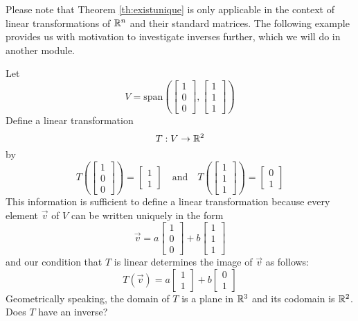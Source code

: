 \documentclass{ximera}
\begin{document}


Please note that Theorem \ref{th:existunique} is only applicable in the context of linear transformations of $\mathbb{R}^n$ and their standard matrices.  The following example provides us with motivation to investigate inverses further, which we will do in another module.

\begin{initprob}\label{init:subtosub}
Let $$V=\text{span}\left(\begin{bmatrix}1\\0\\0\end{bmatrix}, \begin{bmatrix}1\\1\\1\end{bmatrix}\right)$$
Define a linear transformation $$T:V\rightarrow \mathbb{R}^2$$
by $$T\left(\begin{bmatrix}1\\0\\0\end{bmatrix}\right)=\begin{bmatrix}1\\1\end{bmatrix}\quad \text{and} \quad T\left(\begin{bmatrix}1\\1\\1\end{bmatrix}\right)=\begin{bmatrix}0\\1\end{bmatrix}$$
This information is sufficient to define a linear transformation because every element $\vec{v}$ of $V$ can be written uniquely in the form $$\vec{v}=a\begin{bmatrix}1\\0\\0\end{bmatrix}+b\begin{bmatrix}1\\1\\1\end{bmatrix}$$  
and our condition that $T$ is linear determines the image of $\vec{v}$ as follows: $$T(\vec{v})=a\begin{bmatrix}1\\1\end{bmatrix}+b\begin{bmatrix}0\\1\end{bmatrix}$$
Geometrically speaking, the domain of $T$ is a plane in $\mathbb{R}^3$ and its codomain is $\mathbb{R}^2$.  Does $T$ have an inverse?  


\end{initprob}
\end{document}

